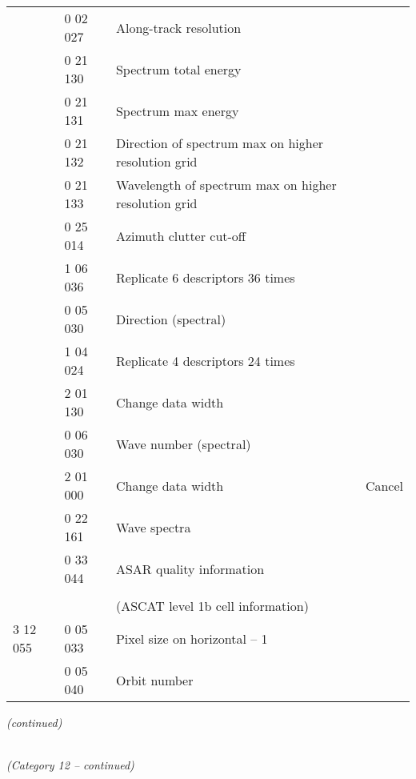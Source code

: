 \begin{longtable}[]{@{}llll@{}}
& 0 02 027 & Along-track resolution &\tabularnewline
& 0 21 130 & Spectrum total energy &\tabularnewline
& 0 21 131 & Spectrum max energy &\tabularnewline
& 0 21 132 & Direction of spectrum max on higher resolution grid &\tabularnewline
& 0 21 133 & Wavelength of spectrum max on higher resolution grid &\tabularnewline
& 0 25 014 & Azimuth clutter cut-off &\tabularnewline
& 1 06 036 & Replicate 6 descriptors 36 times &\tabularnewline
& 0 05 030 & Direction (spectral) &\tabularnewline
& 1 04 024 & Replicate 4 descriptors 24 times &\tabularnewline
& 2 01 130 & Change data width &\tabularnewline
& 0 06 030 & Wave number (spectral) &\tabularnewline
& 2 01 000 & Change data width & Cancel\tabularnewline
& 0 22 161 & Wave spectra &\tabularnewline
& 0 33 044 & ASAR quality information &\tabularnewline
& & &\tabularnewline
& & (ASCAT level 1b cell information) &\tabularnewline
3 12 055 & 0 05 033 & Pixel size on horizontal -- 1 &\tabularnewline
& 0 05 040 & Orbit number &\tabularnewline
\bottomrule
\end{longtable}

\emph{(continued)}

\emph{\\
(Category 12 -- continued)}


